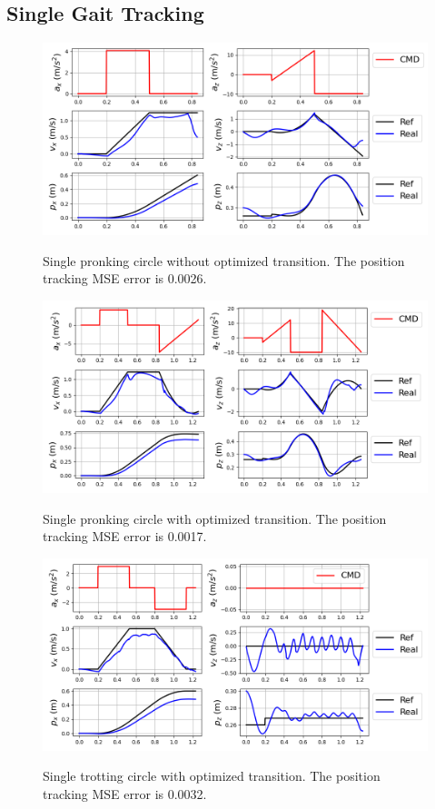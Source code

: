 \documentclass[11pt, conference]{IEEEtran}
\theoremstyle{definition} %
\begin{document}
\subsection{Single Gait Tracking}

\begin{figure}[htb]
    \centering
        \textsf{\includegraphics[width=0.85\columnwidth]{figures/jump_wo_opt_tracking.png}}
        \caption{Single pronking circle without optimized transition. The position tracking MSE error is 0.0026.}
        \label{fig:jump_tracking_wo_opt}
\end{figure}

\begin{figure}[htb]
    \centering
        \textsf{\includegraphics[width=0.85\columnwidth]{figures/jump_w_opt_tracking.png}}
        \caption{Single pronking circle with optimized transition. The position tracking MSE error is 0.0017.}
        \label{fig:jump_tracking_w_opt}
\end{figure}

\begin{figure}[htb]
    \centering
        \textsf{\includegraphics[width=0.85\columnwidth]{figures/trot_ref_tracking.png}}
        \caption{Single trotting circle with optimized transition. The position tracking MSE error is 0.0032.}
        \label{fig:trot_tracking}
\end{figure}
\end{document}
